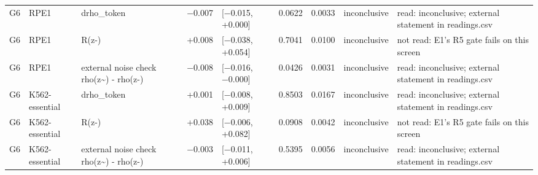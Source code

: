 \begin{tabular}{lllrlrrll}
G6 & RPE1 & drho\_token & −0.007 & [−0.015, +0.000] & 0.0622 & 0.0033 & inconclusive & read: inconclusive; external statement in readings.csv \\
G6 & RPE1 & R(z-) & +0.008 & [−0.038, +0.054] & 0.7041 & 0.0100 & inconclusive & not read: E1's R5 gate fails on this screen \\
G6 & RPE1 & external noise check rho(z\textasciitilde{}) - rho(z-) & −0.008 & [−0.016, −0.000] & 0.0426 & 0.0031 & inconclusive & read: inconclusive; external statement in readings.csv \\
G6 & K562-essential & drho\_token & +0.001 & [−0.008, +0.009] & 0.8503 & 0.0167 & inconclusive & read: inconclusive; external statement in readings.csv \\
G6 & K562-essential & R(z-) & +0.038 & [−0.006, +0.082] & 0.0908 & 0.0042 & inconclusive & not read: E1's R5 gate fails on this screen \\
G6 & K562-essential & external noise check rho(z\textasciitilde{}) - rho(z-) & −0.003 & [−0.011, +0.006] & 0.5395 & 0.0056 & inconclusive & read: inconclusive; external statement in readings.csv \\
\bottomrule
\end{tabular}
